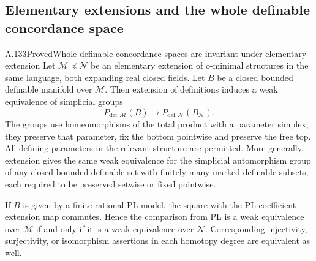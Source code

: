 \subsection{Elementary extensions and the whole definable concordance space}

\begin{saresult}{A.133}{Proved}{Whole definable concordance spaces are invariant under elementary extension}
Let $\mathcal M\preccurlyeq\mathcal N$ be an elementary extension of
o-minimal structures in the same language, both expanding real closed
fields. Let $B$ be a closed bounded definable manifold over $\mathcal M$.
Then extension of definitions induces a weak equivalence of simplicial
groups
\[
 P_{\mathrm{def},\mathcal M}(B)
 \longrightarrow
 P_{\mathrm{def},\mathcal N}(B_{\mathcal N}).
\]
The groups use homeomorphisms of the total product with a parameter
simplex; they preserve that parameter, fix the bottom pointwise and
preserve the free top. All defining parameters in the relevant structure
are permitted. More generally, extension gives the same weak equivalence for the
simplicial automorphism group of any closed bounded definable set
with finitely many marked definable subsets, each required to be
preserved setwise or fixed pointwise.

If $B$ is given by a finite rational PL model, the square with the PL
coefficient-extension map commutes. Hence the comparison from PL is a
weak equivalence over $\mathcal M$ if and only if it is a weak equivalence
over $\mathcal N$. Corresponding injectivity, surjectivity, or isomorphism assertions
in each homotopy degree are equivalent as well.
\end{saresult}

